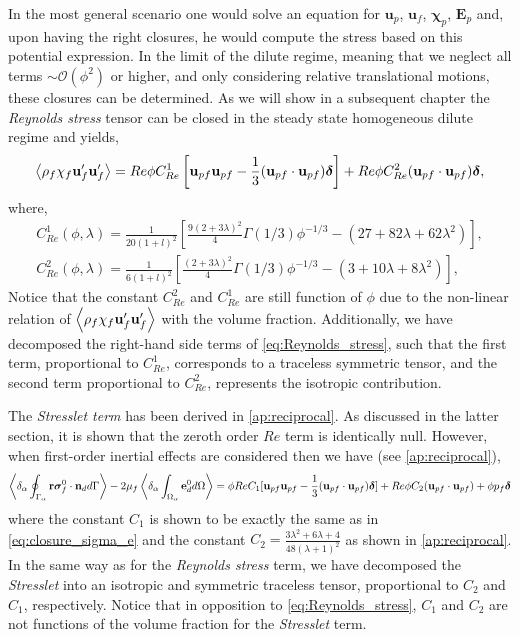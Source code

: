 In the most general scenario one would solve an equation for $\textbf{u}_p$, $\textbf{u}_f$, $\bm\chi_p$, $\textbf{E}_p$ and, upon having the right closures, he would compute the stress based on this potential expression. 
In the limit of the dilute regime, meaning that we neglect all terms $\sim \mathcal{O}(\phi^2)$ or higher, and only considering relative translational motions, these closures can be determined. 
As we will show in a subsequent chapter the \textit{Reynolds stress} tensor can be closed in the steady state homogeneous dilute regime and yields, 
\begin{equation}
    \avg{\rho_f\chi_f\textbf{u}_f'\textbf{u}'_f}
    = Re  \phi C_{Re}^1 \left[
        \textbf{u}_{pf}
        \textbf{u}_{pf}
        -\frac{1}{3}
        (\textbf{u}_{pf}
        \cdot\textbf{u}_{pf})\bm\delta
    \right]
    + Re \phi C_{Re}^2 (\textbf{u}_{pf}\cdot\textbf{u}_{pf}) \bm\delta, 
    \label{eq:Reynolds_stress}
\end{equation}
where, 
\begin{align*}
    C_{Re}^1(\phi,\lambda)
    = \frac{1}{20(1+l)^2}\left[
        \frac{9(2+3\lambda)^2}{4}\Gamma(1/3) \phi^{-1/3}
        - (27+82\lambda +62\lambda^2)
    \right],\\
    C_{Re}^2(\phi,\lambda)
    = \frac{1}{6(1+l)^2}\left[
        \frac{(2+3\lambda)^2}{4}\Gamma(1/3) \phi^{-1/3}
        - (3+10\lambda +8\lambda^2)
    \right],
\end{align*}
Notice that the constant $C_{Re}^2$ and $C_{Re}^1$ are still function of $\phi$ due to the non-linear relation of $\left<\rho_f\chi_f\textbf{u}_f'\textbf{u}'_f\right>$ with the volume fraction. 
Additionally, we have decomposed the right-hand side terms of \ref{eq:Reynolds_stress}, such that the first term, proportional to $C_{Re}^1$, corresponds to a traceless symmetric tensor, and the second term proportional to $C_{Re}^2$, represents the isotropic contribution.  

The \textit{Stresslet term} has been derived in \ref{ap:reciprocal}. 
As discussed in the latter section, it is shown that the zeroth order $Re$ term is identically null. 
However, when first-order inertial effects are considered then we have (see \ref{ap:reciprocal}),
\begin{equation*}
    \pSavg{\textbf{r}\bm{\sigma}_f^0 \cdot \textbf{n}_d}
    - 2 \mu_f \pOavg{\textbf{e}_d^0}
    =
     \phi Re C_1
    [
        \textbf{u}_{pf}\textbf{u}_{pf} - \frac{1}{3}(\textbf{u}_{pf}\cdot \textbf{u}_{pf})\bm\delta 
    ]\\
    + Re \phi C_2 (\textbf{u}_{pf}\cdot \textbf{u}_{pf}) 
    + \phi p_f \bm\delta
    \label{eq:stresslet_trans}
\end{equation*} 
where the constant $C_1$ is shown to be exactly the same as in \ref{eq:closure_sigma_e} and the constant $C_2 =\frac{3\lambda^2 + 6\lambda + 4}{48(\lambda +1 )^2}$ as shown in \ref{ap:reciprocal}. 
In the same way as for the \textit{Reynolds stress} term, we have decomposed the \textit{Stresslet} into an isotropic and symmetric traceless tensor, proportional to $C_2$ and $C_1$, respectively. 
Notice that in opposition to \ref{eq:Reynolds_stress}, $C_1$ and $C_2$ are not functions of the volume fraction for the \textit{Stresslet} term. 

